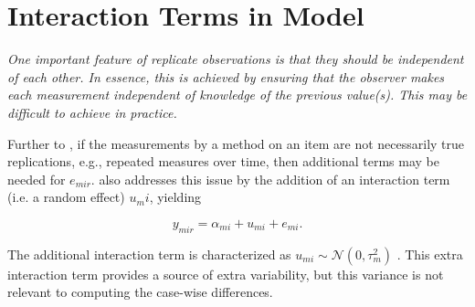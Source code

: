 \documentclass[12pt, a4paper]{report}
\theoremstyle{plain}
\theoremstyle{definition}
\theoremstyle{remark}
\begin{document}
%
%


%
%

\section{Interaction Terms in Model}

\emph{
	One important feature of replicate observations is that they should be independent
	of each other. In essence, this is achieved by ensuring that the observer makes each
	measurement independent of knowledge of the previous value(s). This may be difficult
	to achieve in practice.}


Further to \citet{barnhart}, if the measurements by a method on an item are not necessarily true replications, e.g., repeated measures over time, then additional terms may be needed for $e_{mir}$. \citet{BXC2008} also addresses this issue by the addition of an interaction term (i.e. a random effect) $u_mi$, yielding

\[ y_{mir} =  \alpha_{mi} + u_{mi} + e_{mi}.  \]

The additional interaction term is characterized as $u_{mi}  \sim \mathcal{N}(0, \tau^2_m)$ \citep{BXC2008}. This extra interaction term provides a source of extra variability, but this variance is not relevant to computing the case-wise differences.

%
%
%
%
\end{document}
